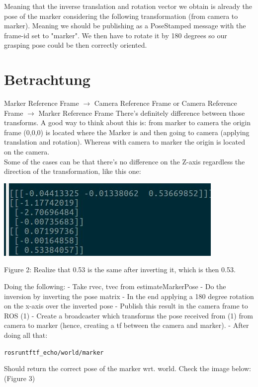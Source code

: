 \documentclass{article}
\begin{document}
Meaning that the inverse translation and rotation vector we obtain is already the pose of the marker considering the following transformation (from camera to marker). Meaning we should be publishing as a PoseStamped message with the frame-id set to "marker". We then have to rotate it by 180 degrees so our grasping pose could be then correctly oriented.

\section{Betrachtung}
Marker Reference Frame $\xrightarrow{}$ Camera Reference Frame or
Camera Reference Frame $\xrightarrow{}$ Marker Reference Frame 
There’s definitely difference between those transforms. A good way to think about this is: from marker to camera the origin frame (0,0,0) is located where the Marker is and then going to camera (applying translation and rotation). Whereas with camera to marker the origin is located on the camera. 
\\
Some of the cases can be that there’s no difference on the Z-axis regardless the direction of the transformation, like this one:
\begin{center}
  \includegraphics[scale=0.5]{pictures/pic2.jpeg}
  
  Figure 2: Realize that 0.53 is the same after inverting it, which is then 0.53.
\end{center}
Doing the following:
- Take rvec, tvec from estimateMarkerPose
- Do the inversion by inverting the pose matrix
- In the end applying a 180 degree rotation on the x-axis over the inverted pose
- Publish this result in the camera frame to ROS (1)
- Create a broadcaster which transforms the pose received from (1) from camera to marker (hence, creating a tf between the camera and marker).
- After doing all that:
\begin{alltt}
    rosrun tf tf_echo /world /marker 
\end{alltt}
Should return the correct pose of the marker wrt. world. Check the image below: (Figure 3)
\end{document}
